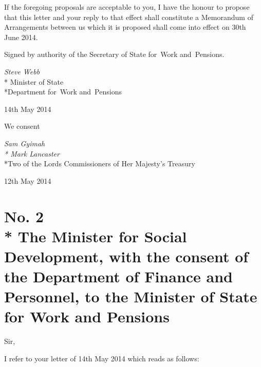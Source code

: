 \documentclass[12pt,a4paper]{article}
\begin{document}
If the foregoing proposals are acceptable to you, I have the honour to propose that this 
letter and your reply to that effect shall constitute a Memorandum of Arrangements
between us which it is proposed shall come into effect on 30th June 2014.

\bigskip

\pagebreak[3]

Signed 
by authority of the 
Secretary of State for~Work and~Pensions.

{\raggedleft
\emph{Steve Webb}\\*
Minister
of State\\*Department 
for~Work and~Pensions

}

14th May 2014

\bigskip

\pagebreak[3]

We consent

{\raggedleft
\emph{Sam Gyimah\\*
Mark Lancaster}\\*Two of the Lords Commissioners of Her Majesty's Treasury

}

12th May 2014

\section*{No. 2\\*
The Minister for Social Development, with the consent of the Department of Finance and Personnel, to the Minister of State for Work and Pensions}

Sir,

I refer to your letter of 14th May 2014 which reads as follows:
\end{document}
